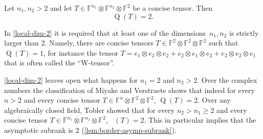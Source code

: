 \documentclass{daj}
\DeclareMathOperator{\subrank}{Q}
\DeclareMathOperator{\bordersubrank}{\underline{Q}}
\newcommand{\FF}{\mathbb{F}}
\begin{document}
\begin{theorem}\label{local-dim-2}
    Let $n_1,n_2 > 2$ and let $T\in\mathbb{F}^{n_1}\otimes\mathbb{F}^{n_2}\otimes\mathbb{F}^2$ be a concise tensor. Then
    \[\subrank(T)=2.\]
\end{theorem}
%
%

\begin{example}
    In \autoref{local-dim-2} it is required that at least one of the dimensions~$n_1, n_2$ is strictly larger than 2.
    Namely, there are concise tensors $T \in \FF^2 \otimes \FF^2 \otimes \FF^2$ such that $\subrank(T) = 1$, for instance the tensor $T=e_1 \otimes e_2 \otimes e_2 + e_2 \otimes e_1 \otimes e_2 + e_2 \otimes e_2 \otimes e_1$ that is often called the ``W-tensor''. 
\end{example}

\begin{remark}
    \autoref{local-dim-2} leaves open what happens for $n_1=2$ and $n_2 > 2$. 
    Over the complex numbers the classification %
    of Miyake and Verstraete \cite{miake2004multipartite22n} shows that indeed for every $n>2$ and every concise tensor $T \in \FF^{n} \otimes \FF^2 \otimes \FF^2$, $\subrank(T)=2$.
    Over any algebraically closed field, Tobler \cite[Section 4.2]{Tobler1997Spezi-6235} showed that for every $n_2>n_1\geq2$ and every concise tensor $T \in \FF^{n_1} \otimes \FF^{n_2} \otimes \FF^2$, $\bordersubrank(T)=2$. This in particular implies that the asymptotic subrank is $2$ (\autoref{lem:border-asymp-subrank}). %
    

\end{remark}

%
%
%
%
%

%

%

%
%
    
%
%
\end{document}
